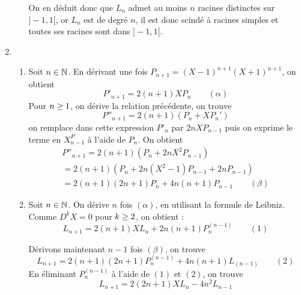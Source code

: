 \begin{enumerate}
\begin{enumerate}
On en déduit donc que $L_n$ admet au moins $n$ racines distinctes sur $]-1,1[$, or $L_n$ est de degré $n$, il est donc scindé à racines simples et toutes ses racines sont dans $]-1,1[$.
\end{enumerate}
\item 
\begin{enumerate}
\item Soit $n\in\mathbb{N}$. En dérivant une fois $P_{n+1}=(X-1)^{n+1}(X+1)^{n+1}$, on obtient $$P'_{n+1}=2(n+1)XP_n\qquad(\alpha)$$
Pour $n\geq1$, on dérive la relation précédente, on trouve 
$$P''_{n+1}=2(n+1)(P_n+XP_n')$$ on remplace dans cette expression $P'_n$ par $2nXP_{n-1}$ puis on exprime le terme en $X^P_{n-1}$ à l'aide de $P_n$. On obtient
\begin{multline*}
 P''_{n+1}=2(n+1)(P_n+2nX^2P_{n-1})\\
=2(n+1)(P_n+2n(X^2-1)P_{n-1}+2nP_{n-1})\\
=2(n+1)(2n+1)P_n+4n(n+1)P_{n-1}\qquad (\beta)
\end{multline*}
\item Soit $n\in\mathbb{N}$. On dérive $n$ fois $(\alpha)$, en utilisant la formule de Leibniz. Comme $D^kX=0$ pour $k\geq 2$, on obtient :
$$L_{n+1}=2(n+1)XL_n+2n(n+1)P_n^{(n-1)}\qquad(1)$$

Dérivons maintenant $n-1$ fois $(\beta)$, on trouve 
$$L_{n+1}=2(n+1)(2n+1)P_n^{(n-1)}+4n(n+1)L_{(n-1)}\qquad(2)$$
En éliminant $P_n^{(n-1)}$ à l'aide de $(1)$ et $(2)$, on trouve 
$$L_{n+1}=2(2n+1)XL_n-4n^2L_{n-1}$$
\end{enumerate}
\end{enumerate}




